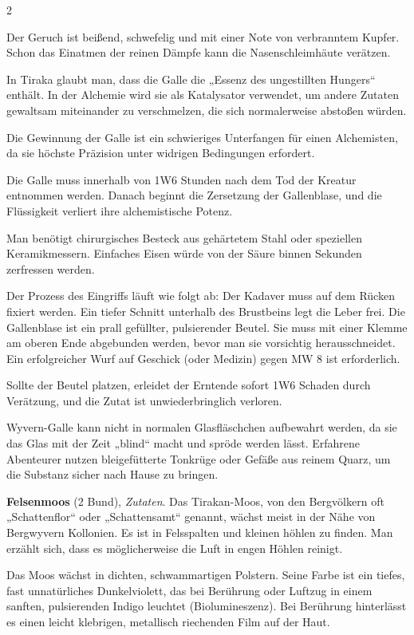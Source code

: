 \begin{multicols}{2}
\begin{denseitemize}
Der Geruch ist beißend, schwefelig und mit einer Note von verbranntem Kupfer. Schon das Einatmen der reinen Dämpfe kann die Nasenschleimhäute verätzen.

In Tiraka glaubt man, dass die Galle die „Essenz des ungestillten Hungers“ enthält. In der Alchemie wird sie als Katalysator verwendet, um andere Zutaten gewaltsam miteinander zu verschmelzen, die sich normalerweise abstoßen würden.

Die Gewinnung der Galle ist ein schwieriges Unterfangen für einen Alchemisten, da sie höchste Präzision unter widrigen Bedingungen erfordert.

Die Galle muss innerhalb von 1W6 Stunden nach dem Tod der Kreatur entnommen werden. Danach beginnt die Zersetzung der Gallenblase, und die Flüssigkeit verliert ihre alchemistische Potenz.

Man benötigt chirurgisches Besteck aus gehärtetem Stahl oder speziellen Keramikmessern. Einfaches Eisen würde von der Säure binnen Sekunden zerfressen werden.

Der Prozess des Eingriffs läuft wie folgt ab: Der Kadaver muss auf dem Rücken fixiert werden.
Ein tiefer Schnitt unterhalb des Brustbeins legt die Leber frei.
Die Gallenblase ist ein prall gefüllter, pulsierender Beutel. Sie muss mit einer Klemme am oberen Ende abgebunden werden, bevor man sie vorsichtig herausschneidet. Ein erfolgreicher Wurf auf Geschick (oder Medizin) gegen MW 8 ist erforderlich.

Sollte der Beutel platzen, erleidet der Erntende sofort 1W6 Schaden durch Verätzung, und die Zutat ist unwiederbringlich verloren. 

Wyvern-Galle kann nicht in normalen Glasfläschchen aufbewahrt werden, da sie das Glas mit der Zeit „blind“ macht und spröde werden lässt. Erfahrene Abenteurer nutzen bleigefütterte Tonkrüge oder Gefäße aus reinem Quarz, um die Substanz sicher nach Hause zu bringen.
        \item \textbf{Felsenmoos} (2 Bund), \textit{Zutaten}.
        Das Tirakan-Moos, von den Bergvölkern oft „Schattenflor“ oder „Schattensamt“ genannt, wächst meist in der Nähe von Bergwyvern Kollonien. Es ist in Felsspalten und kleinen höhlen zu finden. Man erzählt sich, dass es möglicherweise die Luft in engen Höhlen reinigt.

Das Moos wächst in dichten, schwammartigen Polstern. Seine Farbe ist ein tiefes, fast unnatürliches Dunkelviolett, das bei Berührung oder Luftzug in einem sanften, pulsierenden Indigo leuchtet (Biolumineszenz).
Bei Berührung hinterlässt es einen leicht klebrigen, metallisch riechenden Film auf der Haut.


\end{denseitemize}
\end{multicols}
